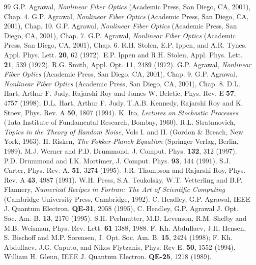 \begin{thebibliography}{99}
 G.P. Agrawal, {\em Nonlinear Fiber Optics} (Academic
Press, San Diego, CA, 2001), Chap. 4.
 G.P. Agrawal, {\em Nonlinear Fiber Optics} (Academic
Press, San Diego, CA, 2001), Chap. 10.
 G.P. Agrawal, {\em Nonlinear Fiber Optics} (Academic
Press, San Diego, CA, 2001), Chap. 7.
 G.P. Agrawal, {\em Nonlinear Fiber Optics} (Academic
Press, San Diego, CA, 2001), Chap. 6.
 R.H. Stolen, E.P. Ippen, and A.R. Tynes,
Appl. Phys. Lett. \textbf{20}, 62 (1972).
 E.P. Ippen and R.H. Stolen, Appl. Phys. Lett. \textbf{21},
539 (1972).
 R.G. Smith, Appl. Opt. \textbf{11}, 2489 (1972).
 G.P. Agrawal, {\em Nonlinear Fiber Optics} (Academic
Press, San Diego, CA, 2001), Chap. 9.
 G.P. Agrawal, {\em Nonlinear Fiber Optics} (Academic
Press, San Diego, CA, 2001), Chap. 8.
 D.L. Hart, Arthur F. Judy, Rajarshi Roy and James W. Beletic, Phys. Rev. E \textbf{57}, 4757 (1998); D.L. Hart, Arthur F. Judy, T.A.B. Kennedy, Rajarshi Roy and K. Stoev, Phys. Rev. A \textbf{50}, 1807 (1994).
 K. Ito, {\em Lectures on Stochastic Processes} (Tata Institute of Fundamental Research, Bombay, 1960).
 R.L. Stratanovich, {\em Topics in the Theory of Random Noise}, Vols I. and II. (Gordon \& Breach, New York, 1963).
 H. Risken, {\em The Fokker-Planck Equation} (Springer-Verlag, Berlin, 1989).
 M.J. Werner and P.D. Drummond, J. Comput. Phys. \textbf{132}, 312 (1997).
 P.D. Drummond and I.K. Mortimer, J. Comput. Phys. \textbf{93}, 144 (1991).
 S.J. Carter, Phys. Rev. A. \textbf{51}, 3274 (1995).
 J.R. Thompson and Rajarshi Roy, Phys. Rev. A \textbf{43}, 4987 (1991).
 W.H. Press, S.A. Teukolsky, W.T. Vetterling and B.P. Flannery, {\em Numerical Recipes in Fortran: The Art of Scientific Computing} (Cambridge University Press, Cambridge, 1992).
 C. Headley, G.P. Agrawal, IEEE J. Quantum Electron. \textbf{QE-31}, 2058 (1995), C. Headley, G.P. Agrawal J. Opt. Soc. Am. B. \textbf{13}, 2170 (1995).
 S.H. Perlmutter, M.D. Levenson, R.M. Shelby and
M.B. Weisman, Phys. Rev. Lett. \textbf{61} 1388, 1988.
 F. Kh. Abdullaev, J.H. Hensen, S. Bischoff and M.P. Sorensen, J. Opt. Soc. Am. B. \textbf{15}, 2424 (1998); F. Kh. Abdullaev, J.G. Caputo, and Nikos Flytzanis, Phys. Rev E. \textbf{50}, 1552 (1994).
 William H. Glenn, IEEE J. Quantum Electron. \textbf{QE-25}, 1218 (1989).

\end{thebibliography}
